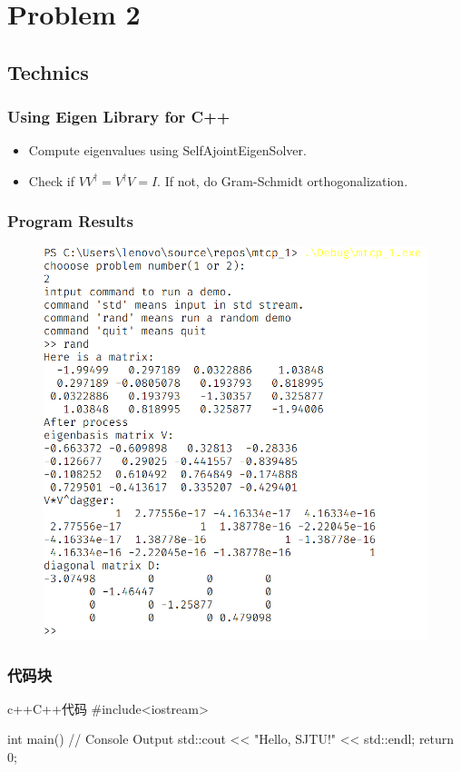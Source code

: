 \section{Problem 2}
\subsection{Technics}

    \begin{frame}
        \frametitle{Using Eigen Library for C++}

        \begin{itemize}
            \item Compute eigenvalues using SelfAjointEigenSolver.
            \item Check if \(VV^\dagger = V^\dagger V = I\). If not, do Gram-Schmidt orthogonalization.
        \end{itemize}

    \end{frame}

    \begin{frame}
    \frametitle{Program Results}
    
    \begin{figure}
        \centering
        \includegraphics[height = 0.8\textheight]{img/result2.png}
    \end{figure}
\end{frame}

\begin{frame}[fragile]          %
    \frametitle{代码块}
    \begin{codeblock}{c++}{C++代码}
#include<iostream>

int main(){
// Console Output
std::cout << "Hello, SJTU!" << std::endl;
return 0;
}
    \end{codeblock}
\end{frame}

